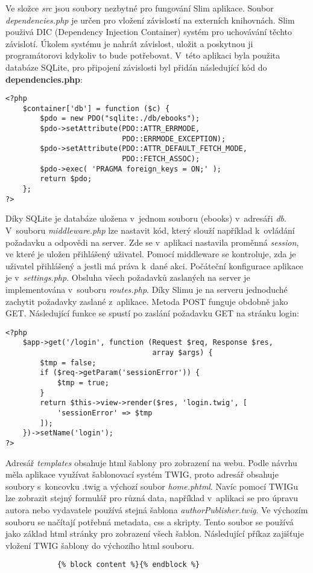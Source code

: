             Ve složce \textit{src} jsou soubory nezbytné pro fungování Slim aplikace. Soubor \textit{dependencies.php} je určen pro vložení závislostí na externích knihovnách. Slim použivá DIC (Dependency Injection Container) systém pro uchovávání těchto závislotí. Úkolem systému je nahrát závislost, uložit a poskytnou ji programátorovi kdykoliv to bude potřebovat. V~této aplikaci byla použita databáze SQLite, pro připojení závislosti byl přidán následující kód do \textbf{dependencies.php}:
            \begin{verbatim}
<?php
    $container['db'] = function ($c) {
        $pdo = new PDO("sqlite:./db/ebooks");
        $pdo->setAttribute(PDO::ATTR_ERRMODE, 
                           PDO::ERRMODE_EXCEPTION);
        $pdo->setAttribute(PDO::ATTR_DEFAULT_FETCH_MODE, 
                           PDO::FETCH_ASSOC);
        $pdo->exec( 'PRAGMA foreign_keys = ON;' );
        return $pdo;
    };
?>
            \end{verbatim}
            Díky SQLite je databáze uložena v~jednom souboru (ebooks) v~adresáři \textit{db}. V~souboru \textit{middleware.php} lze nastavit kód, který slouží například k~ovládání požadavku a odpovědi na server. Zde se v~aplikaci nastavila proměnná \textit{session}, ve které je uložen přihlášený uživatel. Pomocí middleware se kontroluje, zda je uživatel přihlášený a jestli má práva k~dané akci.  Počáteční konfigurace aplikace je v~\textit{settings.php}. Obsluha všech požadavků zaslaných na server je implementována v~souboru \textit{routes.php}. Díky Slimu je na serveru jednoduché zachytit požadavky zaslané z~aplikace. Metoda POST funguje obdobně jako GET. Následující funkce se spustí po zaslání požadavku GET na stránku login:
            \pagebreak
            \begin{verbatim}
<?php
    $app->get('/login', function (Request $req, Response $res, 
                                  array $args) {
        $tmp = false;
        if ($req->getParam('sessionError')) {
            $tmp = true;
        }
        return $this->view->render($res, 'login.twig', [
            'sessionError' => $tmp
        ]);
    })->setName('login');
?>
            \end{verbatim}
            
            Adresář \textit{templates} obsahuje html šablony pro zobrazení na webu. Podle návrhu měla aplikace využívat šablonovací systém TWIG, proto adresář obsahuje soubory s~koncovku .twig a výchozí soubor \textit{home.phtml}. Navíc pomocí TWIGu lze zobrazit stejný formulář pro různá data, například v~aplikaci se pro úpravu autora nebo vydavatele používá stejná šablona \textit{authorPublisher.twig}. Ve výchozím souboru se načítají potřebná metadata, css a skripty. Tento soubor se používá jako základ html stránky pro zobrazení všech šablon. Následující příkaz zajišťuje vložení TWIG šablony do výchozího html souboru. 
            \begin{lstlisting}
            {% block content %}{% endblock %}
            \end{lstlisting}
             
